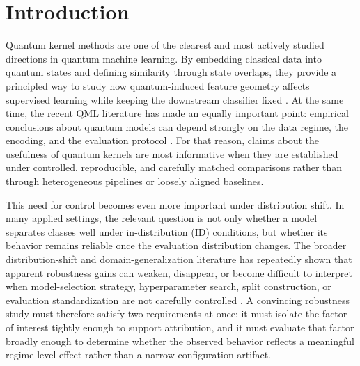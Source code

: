 \documentclass[journal]{IEEEtran}
\begin{document}
\section{Introduction}
\label{sec:introduction}

Quantum kernel methods are one of the clearest and most actively studied directions in quantum machine learning. By embedding classical data into quantum states and defining similarity through state overlaps, they provide a principled way to study how quantum-induced feature geometry affects supervised learning while keeping the downstream classifier fixed \cite{havlicek2019quantumenhanced,schuld2019featurehilbert,schuld2021kernelmethods}. At the same time, the recent QML literature has made an equally important point: empirical conclusions about quantum models can depend strongly on the data regime, the encoding, and the evaluation protocol \cite{huang2021powerofdata,schuld2021encoding,gilfuster2024rethinkinggeneralization,bowles2024betterthanclassical,schnabel2025scrutiny}. For that reason, claims about the usefulness of quantum kernels are most informative when they are established under controlled, reproducible, and carefully matched comparisons rather than through heterogeneous pipelines or loosely aligned baselines.

This need for control becomes even more important under distribution shift. In many applied settings, the relevant question is not only whether a model separates classes well under in-distribution (ID) conditions, but whether its behavior remains reliable once the evaluation distribution changes. The broader distribution-shift and domain-generalization literature has repeatedly shown that apparent robustness gains can weaken, disappear, or become difficult to interpret when model-selection strategy, hyperparameter search, split construction, or evaluation standardization are not carefully controlled \cite{quinonero-candela2008datasetshift,zhou2023dgsurvey,gulrajani2021domainbed,koh2021wilds,yao2022wildtime}. A convincing robustness study must therefore satisfy two requirements at once: it must isolate the factor of interest tightly enough to support attribution, and it must evaluate that factor broadly enough to determine whether the observed behavior reflects a meaningful regime-level effect rather than a narrow configuration artifact.
\end{document}

